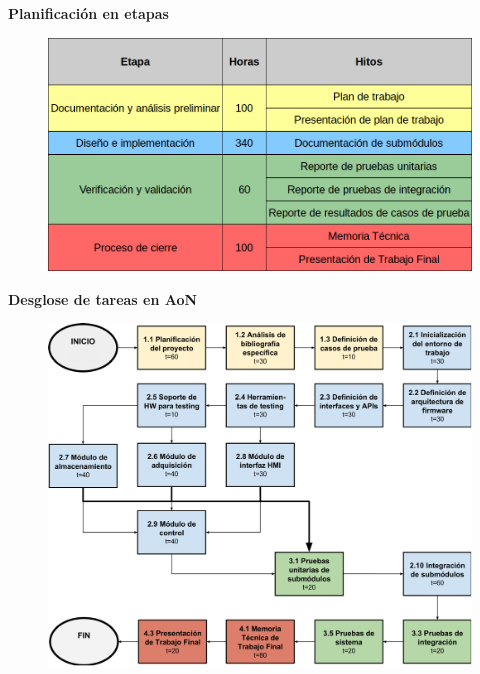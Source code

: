 \documentclass[11pt, xcolor={table,xcdraw}]{beamer}
\begin{document}
\begin{frame}{\textbf{\LARGE{Planificación en etapas}}}
	\vspace{-.7cm}
	\begin{figure}[H]
		{\includegraphics[width=\textwidth]{./imagenes/planificacion.png}}
	\end{figure}	
\end{frame}

\begin{frame}{\textbf{\LARGE{Desglose de tareas en AoN}}}
	\vspace{-.7cm}
	\begin{figure}[H]
		{\includegraphics[height=.8\textheight]{./imagenes/AoN.pdf}}
	\end{figure}	
\end{frame}

\end{document}

